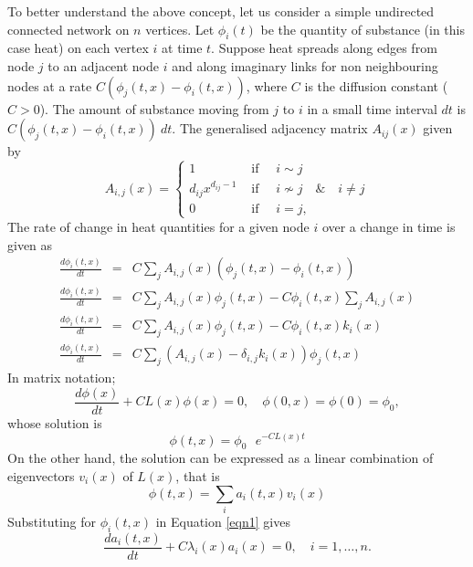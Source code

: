 \documentclass[10pt,a4paper]{article}
\begin{document}
To better understand the above concept, let us consider a simple undirected connected network on $n$ vertices. Let $\phi_i(t)$ be the quantity of substance (in this case heat) on each vertex $i$ at time $t$.  Suppose heat spreads along edges from node $j$ to an adjacent node $i$ and along imaginary links for non neighbouring nodes at a rate $C(\phi_j(t,x) -\phi_i(t,x))$, where $C$ is the diffusion constant ($C>0$). The amount of substance moving from $j$ to $i$ in a small time interval $dt$ is $C(\phi_j(t,x) -\phi_i(t,x))~dt$. 
The generalised adjacency matrix $A_{ij}(x)$ given by\\
\begin{equation*}
A_{i,j}(x) =  
\begin{cases} 
1 &\text{ if } \quad   i \sim j\\
d_{ij} x^{d_{ij}-1} & \text{ if } \quad   i\nsim j \quad  \&  \quad i\neq j \\
0 & \text{ if } \quad  i = j,
\end{cases}
\end{equation*}
The rate of change in heat quantities for a given node $i$ over a change in time is given as 
\begin{eqnarray*}
	\frac{d\phi_{i}(t,x)}{dt} &=& C \sum_{j} A_{i,j}(x) (\phi_j(t,x) - \phi_i(t,x))\\
	\frac{d\phi_{i}(t,x)}{dt} &=& C \sum_{j} A_{i,j}(x) \phi_j(t,x) - C \phi_i(t,x) \sum_{j} A_{i,j}(x)\\
	\frac{d\phi_{i}(t,x)}{dt} &=& C \sum_{j} A_{i,j}(x) \phi_j(t,x) - C \phi_i(t,x) k_{i}(x)\\
	\frac{d\phi_{i}(t,x)}{dt} &=& C \sum_{j} (A_{i,j}(x) - \delta_{i,j} k_{i}(x)) \phi_j(t,x)
\end{eqnarray*}
In matrix notation;
\begin{equation}
\frac{d\phi(x)}{dt} + CL(x) \phi(x) = 0, \quad \phi(0,x) = \phi(0) = \phi_{0} ,
\label{eqn1}
\end{equation}
whose solution is
\begin{equation*}
\phi(t,x)  = \phi_0 \text{  } e^{-CL(x)t}
\end{equation*}
On the other hand, the solution can be expressed as a linear combination of eigenvectors $v_{i}(x)$ of $L(x)$, that is \\
\begin{equation*}
\phi(t,x)  = \sum_i a_{i}(t,x) v_{i} (x)
\end{equation*}
Substituting for $\phi_{i}(t,x)$ in Equation \ref{eqn1} gives
\begin{equation*}
\frac{d a_{i}(t,x)}{dt} + C\lambda_{i}(x) a_{i}(x) = 0, \quad i = 1, \hdots, n.
\end{equation*}
\end{document}

